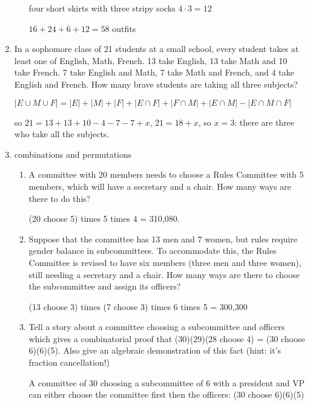 \documentclass[12pt]{article}
\begin{document}
\begin{enumerate}
\begin{enumerate}
four short skirts with three stripy socks  $4 \cdot 3 = 12$

$16+24+6+12 = 58$ outfits

\end{enumerate}



\newpage

\item  In a sophomore class of 21 students at a small school, every student takes at least one of English, Math, French.  13 take English, 13 take Math and
10 take French.  7 take English and Math, 7 take Math and French, and 4 take English and French.  How many brave students are taking all three subjects?

$|E \cup M \cup F| = |E| + |M| + |F| + |E \cap F| + |F \cap M| + |E \cap M| - |E \cap M \cap F|$

so $21 = 13 + 13 + 10 - 4 - 7 - 7 + x$, $21 = 18+x$, so $x=3$:  there are three who take all the subjects.

\newpage

\item  combinations and permutations

\begin{enumerate}

\item  A committee with 20 members needs to choose a Rules Committee with 5 members, which will have a secretary and a chair.  How many ways are there to do this?

(20 choose 5) times 5 times 4 = 310,080.

\item  Suppose that the committee has 13 men and 7 women, but rules require gender balance in subcommittees.  To accommodate this, the Rules Committee is revised to have six members (three men and three women), still needing a secretary and a chair.  How many ways are there to choose the subcommittee and assign its officers?

(13 choose 3) times (7 choose 3) times 6 times 5 = 300,300

\item  Tell a story about a committee choosing a subcommittee and officers which gives a combinatorial proof that \newline (30)(29)(28 choose 4) = (30 choose 6)(6)(5).
Also give an algebraic demonstration of this fact (hint:  it's fraction cancellation!)

A committee of 30 choosing a subcommittee of 6 with a president and VP can either
choose the committee first then the officers:  (30 choose 6)(6)(5)


\end{enumerate}
\end{enumerate}
\end{document}
